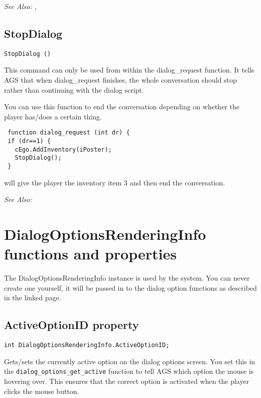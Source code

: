 \it{See Also:} ,


\subsection{StopDialog}\label{StopDialog}%

\begin{verbatim}
StopDialog ()
\end{verbatim}
This command can only be used from within the dialog_request function. It
tells AGS that when dialog_request finishes, the whole conversation should
stop rather than continuing with the dialog script.

You can use this function to end the conversation depending on whether the
player has/does a certain thing.

\begin{verbatim}
 function dialog_request (int dr) {
 if (dr==1) {
   cEgo.AddInventory(iPoster);
   StopDialog();
 }
\end{verbatim}
will give the player the inventory item 3 and then end the conversation.

\it{See Also:} 



\section{DialogOptionsRenderingInfo functions and properties}\label{DialogOptionsRenderingInfoFunctions}%

The DialogOptionsRenderingInfo instance is used by the 
system. You can never create one yourself, it will be passed in to the dialog option functions as
described in the linked page.


\subsection{ActiveOptionID property}\label{DialogOptionsRenderingInfo.ActiveOptionID}%

\begin{verbatim}
int DialogOptionsRenderingInfo.ActiveOptionID;
\end{verbatim}
Gets/sets the currently active option on the dialog options screen. You set this in the
\verb$dialog_options_get_active$ function to tell AGS which option the mouse is hovering over.
This ensures that the correct option is activated when the player clicks the mouse button.

